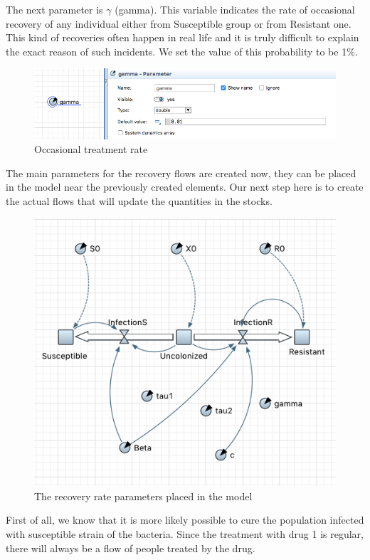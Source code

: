 The next parameter is $\gamma$ (gamma). This variable indicates the rate of occasional recovery of any individual either from Susceptible group or from Resistant one. This kind of recoveries often happen in real life and it is truly difficult to explain the exact reason of such incidents. We set the value of this probability to be 1\%.

\begin{figure}[H]
  \centering
  \includegraphics[height=0.25\textwidth]{img/screens/recovery/recovery4}
  \caption{Occasional treatment rate}
\end{figure}

The main parameters for the recovery flows are created now, they can be placed in the model near the previously created elements. Our next step here is to create the actual flows that will update the quantities in the stocks.

\begin{figure}[H]
  \centering
  \includegraphics[height=0.5\textwidth]{img/screens/recovery/recovery3}
  \caption{The recovery rate parameters placed in the model}
\end{figure}

First of all, we know that it is more likely possible to cure the population infected with susceptible strain of the bacteria. Since the treatment with drug 1 is regular, there will always be a flow of people treated by the drug.

